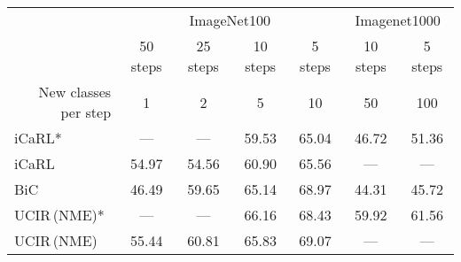 \begin{table*}[t]
    \centering
    \begin{adjustbox}{max width=\textwidth}
        \begin{tabular}{@{}l|cccc|cc@{}}
            \toprule
                                                                & \multicolumn{4}{|c|}{ImageNet100} & \multicolumn{2}{c}{Imagenet1000}                                                                                                         \\
                                                                & 50 steps                          & 25 steps                         & 10 steps                         & 5 steps                          & 10 steps       & 5 steps        \\
            \multicolumn{1}{r|}{New classes per step}           & 1                                 & 2                                & 5                                & 10                               & 50             & 100            \\
            \midrule
            iCaRL* \citep{rebuffi2017icarl}                     & ---                               & ---                              & 59.53                            & 65.04                            & 46.72          & 51.36          \\
            iCaRL                                               & 54.97                             & 54.56                            & 60.90                            & 65.56                            & ---            & ---            \\
            BiC \citep{wu2019bias_correction}                   & 46.49                             & 59.65                            & 65.14                            & 68.97                            & 44.31          & 45.72          \\
            UCIR\,{\scriptsize (\ac{NME})}* \citep{hou2019ucir} & ---                               & ---                              & 66.16                            & 68.43                            & 59.92          & 61.56          \\
            UCIR\,{\scriptsize (\ac{NME})}                      & 55.44                             & 60.81                            & 65.83                            & 69.07                            & ---            & ---            \\

\end{tabular}
\end{adjustbox}
\end{table*}
